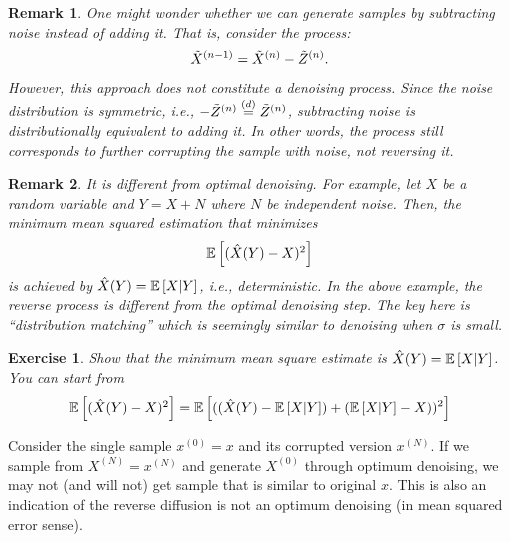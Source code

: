 \documentclass[11pt, a4paper]{article}
\newtheorem{exercise}{Exercise}
\newtheorem{remark}{Remark}
\begin{document}
\begin{remark}
    One might wonder whether we can generate samples by subtracting noise instead of adding it. That is, consider the process:
    \begin{align}
        \tilde{X}^{(n-1)} = \tilde{X}^{(n)} - \tilde{Z}^{(n)}.
    \end{align}
    However, this approach does not constitute a denoising process. Since the noise distribution is symmetric, i.e., \( -\tilde{Z}^{(n)} \overset{(d)}{=} \tilde{Z}^{(n)} \), subtracting noise is distributionally equivalent to adding it. In other words, the process still corresponds to further corrupting the sample with noise, not reversing it.
\end{remark}

\begin{remark}
    It is different from optimal denoising.
    For example, let $X$ be a random variable and $Y= X+N$ where $N$ be independent noise.
    Then, the minimum mean squared estimation that minimizes
    \begin{align}
        \Expec{(\hat{X}(Y)- X)^2}
    \end{align}
    is achieved by $\hat{X}(Y) = \Expec{X|Y}$, i.e., deterministic.
    In the above example, the reverse process is different from the optimal denoising step.
    The key here is ``distribution matching'' which is seemingly similar to denoising when $\sigma$ is small.
\end{remark}

\begin{exercise}
    Show that the minimum mean square estimate is $\hat{X}(Y) = \Expec{X|Y}$.
    You can start from
    \begin{align}
        \Expec{(\hat{X}(Y)-X)^2} = \Expec{((\hat{X}(Y)-\Expec{X|Y}) +(\Expec{X|Y}-X) )^2}
    \end{align}
\end{exercise}

Consider the single sample $x^{(0)}=x$ and its corrupted version $x^{(N)}$.
If we sample from $X^{(N)} = x^{(N)}$ and generate $X^{(0)}$ through optimum denoising, we may not (and will not) get sample that is similar to original $x$.
This is also an indication of the reverse diffusion is not an optimum denoising (in mean squared error sense).
\end{document}
